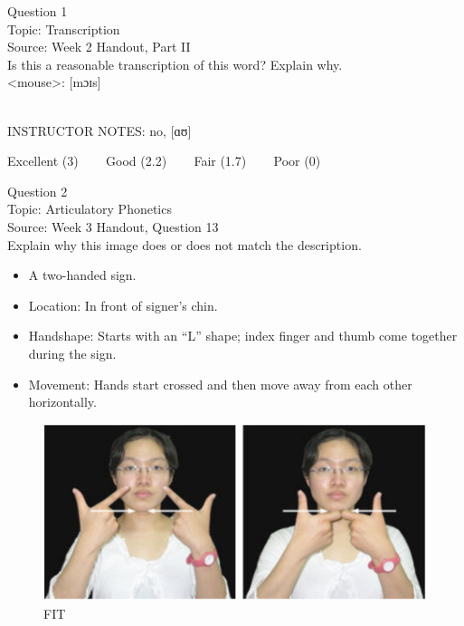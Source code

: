 \documentclass[12pt]{article}
\begin{document}
\begin{center}
\textbf{{\color{blue}{\HUGE START OF EXAM\\}}}

\textbf{{\color{blue}{\HUGE Student ID: 11925\\}}}

\textbf{{\color{blue}{\HUGE \\}}}

\end{center}
\newpage

{\large Question 1}\\

Topic: Transcription\\
Source: Week 2 Handout, Part II\\

Is this a reasonable transcription of this word? Explain why.\\

<mouse>: {[mɔɪs]}


~\\
INSTRUCTOR NOTES: no, [ɑʊ]


\vfill
Excellent (3) ~~~ Good (2.2) ~~~ Fair (1.7) ~~~ Poor (0)
\newpage

{\large Question 2}\\

Topic: Articulatory Phonetics\\
Source: Week 3 Handout, Question 13\\

Explain why this image does or does not match the description.\\

\begin{itemize} \item A two-handed sign. \item Location: In front of signer’s chin. \item Handshape: Starts with an “L” shape; index finger and thumb come together during the sign. \item Movement: Hands start crossed and then move away from each other horizontally. \end{itemize}

\begin{figure}[H]
\includegraphics{../images/taiwansign_fit.png}
\caption{FIT}
\end{figure}
\end{document}

